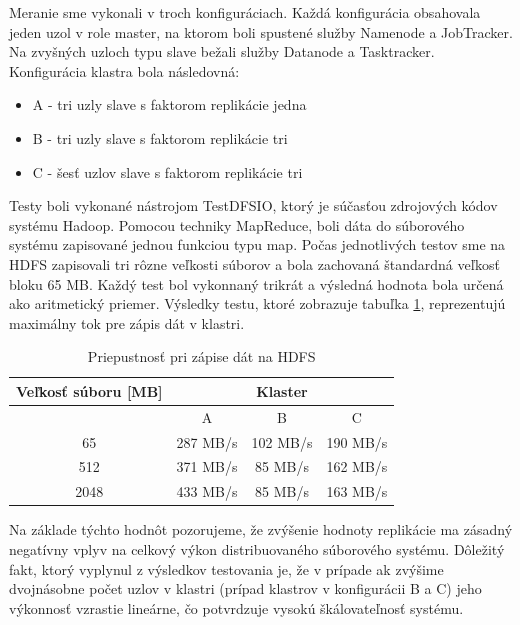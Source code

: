 \documentclass[11pt,twoside,a4paper]{book}
\begin{document}
Meranie sme vykonali v troch konfiguráciach. Každá konfigurácia obsahovala jeden uzol v role master, na ktorom boli spustené služby Namenode a JobTracker. Na zvyšných uzloch typu slave bežali služby Datanode a Tasktracker. Konfigurácia klastra bola následovná:

\begin{itemize}
 \item A - tri uzly slave s faktorom replikácie jedna
 \item B - tri uzly slave s faktorom replikácie tri
 \item C - šesť uzlov slave s faktorom replikácie tri
\end{itemize}

Testy boli vykonané nástrojom TestDFSIO, ktorý je súčasťou zdrojových kódov systému Hadoop. Pomocou techniky MapReduce, boli dáta do súborového systému zapisované jednou funkciou typu map. Počas jednotlivých testov sme na HDFS zapisovali tri rôzne veľkosti súborov a bola zachovaná štandardná veľkosť bloku 65 MB. Každý test bol vykonnaný trikrát a výsledná hodnota bola určená ako aritmetický priemer. Výsledky testu, ktoré zobrazuje tabuľka \ref{tab:HDFSperformance}, reprezentujú maximálny tok pre zápis dát v klastri.

\begin{table}[hp]
\begin{center}
\begin{tabular}{|c|c|c|c|}
\hline 
\multirow{2}{*}{Veľkosť súboru [MB]} & \multicolumn{3}{|c|}{Klaster}  \\
\hline & A & B & C\\
\hline 65 & 287 MB/s& 102 MB/s& 190 MB/s\\ 
\hline 512 & 371 MB/s& 85 MB/s& 162 MB/s\\ 
\hline 2048 & 433 MB/s& 85 MB/s& 163 MB/s\\ 
\hline
\end{tabular} 
\end{center}
\caption{Priepustnosť pri zápise dát na HDFS}
\label{tab:HDFSperformance}
\end{table}

% 
% 

Na základe týchto hodnôt pozorujeme, že zvýšenie hodnoty replikácie ma zásadný negatívny vplyv na celkový výkon distribuovaného súborového systému. Dôležitý fakt, ktorý vyplynul z výsledkov testovania je, že v prípade ak zvýšime dvojnásobne počet uzlov v klastri (prípad klastrov v konfigurácii B a C) jeho výkonnosť vzrastie lineárne, čo potvrdzuje vysokú škálovateľnosť systému. 
\end{document}
